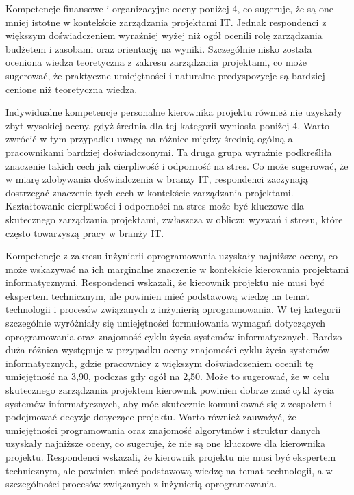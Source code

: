 Kompetencje finansowe i organizacyjne oceny poniżej 4, co sugeruje, że są one mniej istotne w kontekście zarządzania projektami IT. Jednak respondenci z większym doświadczeniem wyraźniej wyżej niż ogół ocenili rolę zarządzania budżetem i zasobami oraz orientację na wyniki. Szczególnie nisko została oceniona wiedza teoretyczna z zakresu zarządzania projektami, co może sugerować, że praktyczne umiejętności i naturalne predyspozycje są bardziej cenione niż teoretyczna wiedza.

Indywidualne kompetencje personalne kierownika projektu również nie uzyskały zbyt wysokiej oceny, gdyż średnia dla tej kategorii wyniosła poniżej 4. Warto zwrócić w tym przypadku uwagę na różnice między średnią ogólną a pracownikami bardziej doświadczonymi. Ta druga grupa wyraźnie podkreśliła znaczenie takich cech jak cierpliwość i odporność na stres. Co może sugerować, że w miarę zdobywania doświadczenia w branży IT, respondenci zaczynają dostrzegać znaczenie tych cech w kontekście zarządzania projektami. Kształtowanie cierpliwości i odporności na stres może być kluczowe dla skutecznego zarządzania projektami, zwłaszcza w obliczu wyzwań i stresu, które często towarzyszą pracy w branży IT.

Kompetencje z zakresu inżynierii oprogramowania uzyskały najniższe oceny, co może wskazywać na ich marginalne znaczenie w kontekście kierowania projektami informatycznymi. Respondenci wskazali, że kierownik projektu nie musi być ekspertem technicznym, ale powinien mieć podstawową wiedzę na temat technologii i procesów związanych z inżynierią oprogramowania. W tej kategorii szczególnie wyróżniały się umiejętności formułowania wymagań dotyczących oprogramowania oraz znajomość cyklu życia systemów informatycznych. Bardzo duża różnica występuje w przypadku oceny znajomości cyklu życia systemów informatycznych, gdzie pracownicy z większym doświadczeniem ocenili tę umiejętność na 3{,}90, podczas gdy ogół na 2{,}50. Może to sugerować, że w celu skutecznego zarządzania projektem kierownik powinien dobrze znać cykl życia systemów informatycznych, aby móc skutecznie komunikować się z zespołem i podejmować decyzje dotyczące projektu. Warto również zauważyć, że umiejętności programowania oraz znajomość algorytmów i struktur danych uzyskały najniższe oceny, co sugeruje, że nie są one kluczowe dla kierownika projektu. Respondenci wskazali, że kierownik projektu nie musi być ekspertem technicznym, ale powinien mieć podstawową wiedzę na temat technologii, a w szczególności procesów związanych z inżynierią oprogramowania.

